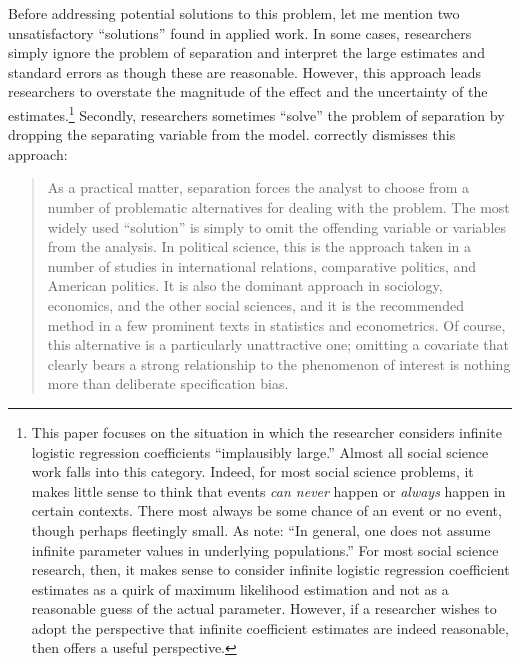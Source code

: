 \documentclass[12pt]{article}
\begin{document}
Before addressing potential solutions to this problem, let me mention two unsatisfactory ``solutions'' found in applied work. 
In some cases, researchers simply ignore the problem of separation and interpret the large estimates and standard errors as though these are reasonable. 
However, this approach leads researchers to overstate the magnitude of the effect and the uncertainty of the estimates.\footnote{
This paper focuses on the situation in which the researcher considers infinite logistic regression coefficients ``implausibly large.'' 
Almost all social science work falls into this category. 
Indeed, for most social science problems, it makes little sense to think that events \textit{can never} happen or \textit{always} happen in certain contexts. 
There most always be some chance of an event or no event, though perhaps fleetingly small. 
As \citet[p. 2409]{HeinzeSchemper2002} note: ``In general, one does not assume infinite parameter values in underlying populations.'' 
For most social science research, then, it makes sense to consider infinite logistic regression coefficient estimates as a quirk of maximum likelihood estimation and not as a reasonable guess of the actual parameter.  
However, if a researcher wishes to adopt the perspective that infinite coefficient estimates are indeed reasonable, then \cite{Geyer2009} offers a useful perspective.} 
Secondly, researchers sometimes ``solve'' the problem of separation by dropping the separating variable from the model. 
\citet[pp. 161-162]{Zorn2005} correctly dismisses this approach:
\begin{quote}
As a practical matter, separation forces the analyst to choose from a number of problematic alternatives for dealing with the problem. The most widely used ``solution'' is simply to omit the offending variable or variables from the analysis. In political science, this is the approach taken in a number of studies in international relations, comparative politics, and American politics. It is also the dominant approach in sociology, economics, and the other social sciences, and it is the recommended method in a few prominent texts in statistics and econometrics. Of course, this alternative is a particularly unattractive one; omitting a covariate that clearly bears a strong relationship to the phenomenon of interest is nothing more than deliberate specification bias.
\end{quote}
\end{document}
